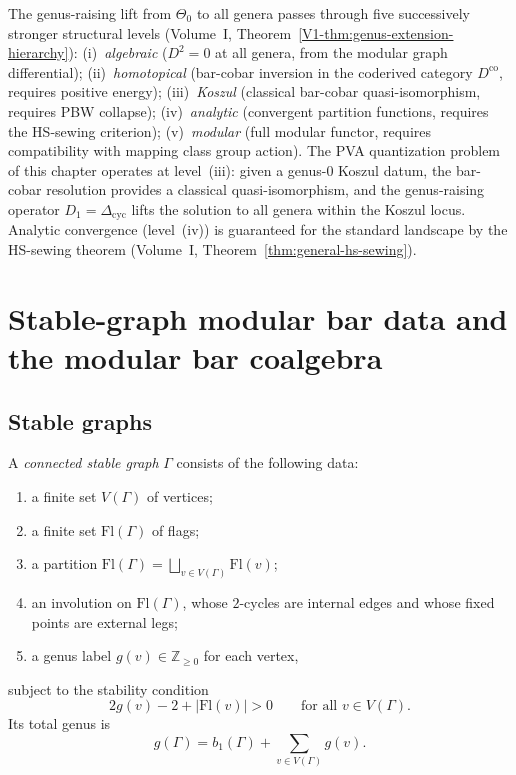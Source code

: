 \begin{remark}
\label{rem:genus-extension-hierarchy-pva}
The genus-raising lift from $\Theta_0$ to all genera passes through
five successively stronger structural levels
(Volume~I, Theorem~\ref{V1-thm:genus-extension-hierarchy}):
\textup{(i)}~\emph{algebraic} ($D^2 = 0$ at all genera, from the
modular graph differential);
\textup{(ii)}~\emph{homotopical} (bar-cobar inversion in the
coderived category $D^{\mathrm{co}}$, requires positive energy);
\textup{(iii)}~\emph{Koszul} (classical bar-cobar quasi-isomorphism,
requires PBW collapse);
\textup{(iv)}~\emph{analytic} (convergent partition functions,
requires the HS-sewing criterion);
\textup{(v)}~\emph{modular} (full modular functor, requires
compatibility with mapping class group action).
The PVA quantization problem of this chapter operates at
level~\textup{(iii)}: given a genus-$0$ Koszul datum, the
bar-cobar resolution provides a classical quasi-isomorphism,
and the genus-raising operator $D_1 = \Delta_{\mathrm{cyc}}$
lifts the solution to all genera within the Koszul
locus. Analytic convergence (level~\textup{(iv)}) is guaranteed
for the standard landscape by the HS-sewing theorem
(Volume~I, Theorem~\ref{thm:general-hs-sewing}).
\end{remark}

\section{Stable-graph modular bar data and the modular bar coalgebra}

\subsection{Stable graphs}

\begin{definition}
A \emph{connected stable graph} $\Gamma$ consists of the following data:
\begin{enumerate}[leftmargin=2.4em]
\item a finite set $V(\Gamma)$ of vertices;
\item a finite set $\mathrm{Fl}(\Gamma)$ of flags;
\item a partition $\mathrm{Fl}(\Gamma)=\bigsqcup_{v\in V(\Gamma)}\mathrm{Fl}(v)$;
\item an involution on $\mathrm{Fl}(\Gamma)$, whose $2$-cycles are internal edges and
whose fixed points are external legs;
\item a genus label $g(v)\in \mathbb Z_{\ge 0}$ for each vertex,
\end{enumerate}
subject to the stability condition
\[
2g(v)-2+|\mathrm{Fl}(v)|>0
\qquad\text{for all }v\in V(\Gamma).
\]
Its total genus is
\[
g(\Gamma)=b_1(\Gamma)+\sum_{v\in V(\Gamma)}g(v).
\]
\end{definition}

